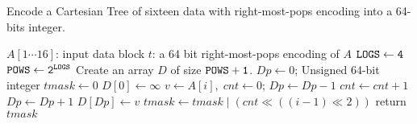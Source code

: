 \begin{algorithm}[!thb]
  \caption{Encode a Cartesian Tree of sixteen data with
    right-most-pops encoding into a 64-bits integer.}
  \label{alg:cartesian-to-64bits}
  \begin{algorithmic}[1]
    \Require
      $A[1 \cdots 16]$: input data block
    \Ensure 
      $t$: a 64 bit right-most-pops encoding of $A$
      \State $\tt{LOGS} \gets 4$
      \State $\tt{POWS} \gets 2^{\tt{LOGS}}$
      \State Create an array $D$ of size $\tt{POWS}+1$.
      \State $\textit{Dp} \gets 0$;
      \State Unsigned 64-bit integer $\textit{tmask} \gets 0$
      \State $D[0] \gets \infty$
        \State $v \gets A[i], \; \textit{cnt} \gets 0$;
          \State $\textit{Dp} \gets \textit{Dp}-1$
          \State $\textit{cnt} \gets \textit{cnt} + 1$
        \EndWhile
        \State $\textit{Dp} \gets \textit{Dp}+1$
        \State $D[\textit{Dp}] \gets v$
        \State $\textit{tmask} \gets \textit{tmask} \mathrel{|} (cnt \ll ((i-1) \ll 2))$
      \EndFor
      \State return $tmask$
  \end{algorithmic}
\end{algorithm}
